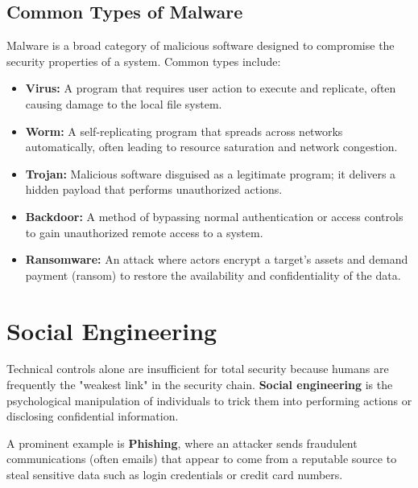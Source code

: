 \subsection{Common Types of Malware}
Malware is a broad category of malicious software designed to compromise the security properties of a system. Common types include:
\begin{itemize}
    \item \textbf{Virus:} A program that requires user action to execute and replicate, often causing damage to the local file system.
    \item \textbf{Worm:} A self-replicating program that spreads across networks automatically, often leading to resource saturation and network congestion.
    \item \textbf{Trojan:} Malicious software disguised as a legitimate program; it delivers a hidden payload that performs unauthorized actions.
    \item \textbf{Backdoor:} A method of bypassing normal authentication or access controls to gain unauthorized remote access to a system.
    \item \textbf{Ransomware:} An attack where actors encrypt a target's assets and demand payment (ransom) to restore the availability and confidentiality of the data.
\end{itemize}

\section{Social Engineering}
Technical controls alone are insufficient for total security because humans are frequently the "weakest link" in the security chain. \textbf{Social engineering} is the psychological manipulation of individuals to trick them into performing actions or disclosing confidential information.

A prominent example is \textbf{Phishing}, where an attacker sends fraudulent communications (often emails) that appear to come from a reputable source to steal sensitive data such as login credentials or credit card numbers.
